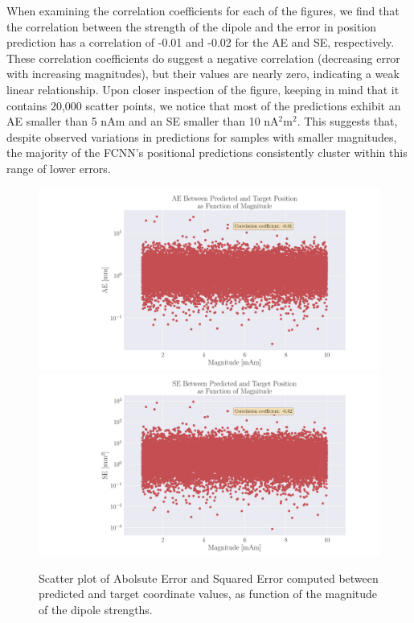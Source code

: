 \documentclass[a4paper, UKenglish, 11pt]{uiomaster}
\begin{document}
When examining the correlation coefficients for each of the figures, we find that the correlation between the strength of the dipole and the error in position prediction has a correlation of -0.01 and -0.02 for the AE and SE, respectively. These correlation coefficients do suggest a negative correlation (decreasing error with increasing magnitudes), but their values are nearly zero, indicating a weak linear relationship. Upon closer inspection of the figure, keeping in mind that it contains 20,000 scatter points, we notice that most of the predictions exhibit an AE smaller than 5 nAm and an SE smaller than 10 nA$^2$m$^2$. This suggests that, despite observed variations in predictions for samples with smaller magnitudes, the majority of the FCNN's positional predictions consistently cluster within this range of lower errors.

\begin{figure}
  \includegraphics[width=12cm]{figures/mae_amplitude0.pdf}
  \includegraphics[width=12cm]{figures/mse_amplitude0.pdf}
  \caption{Scatter plot of Abolsute Error and Squared Error computed between predicted and target coordinate values, as function of the magnitude of the dipole strengths.}
  \label{fig:magnitude_errors}
\end{figure}
\end{document}
